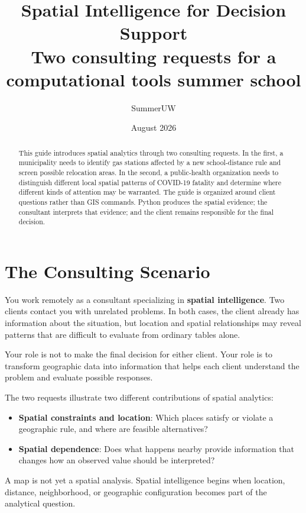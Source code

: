 \documentclass[11pt]{article}
\title{\textbf{Spatial Intelligence for Decision Support}\\[0.4em]
\large Two consulting requests for a computational tools summer school}
\author{SummerUW}
\date{August 2026}
\begin{document}
\maketitle

\begin{abstract}
This guide introduces spatial analytics through two consulting requests. In the first, a municipality needs to identify gas stations affected by a new school-distance rule and screen possible relocation areas. In the second, a public-health organization needs to distinguish different local spatial patterns of COVID-19 fatality and determine where different kinds of attention may be warranted. The guide is organized around client questions rather than GIS commands. Python produces the spatial evidence; the consultant interprets that evidence; and the client remains responsible for the final decision.
\end{abstract}

\tableofcontents
\newpage

\section{The Consulting Scenario}

You work remotely as a consultant specializing in \textbf{spatial intelligence}. Two clients contact you with unrelated problems. In both cases, the client already has information about the situation, but location and spatial relationships may reveal patterns that are difficult to evaluate from ordinary tables alone.

Your role is not to make the final decision for either client. Your role is to transform geographic data into information that helps each client understand the problem and evaluate possible responses.

The two requests illustrate two different contributions of spatial analytics:

\begin{itemize}[leftmargin=*]
    \item \textbf{Spatial constraints and location}: Which places satisfy or violate a geographic rule, and where are feasible alternatives?
    \item \textbf{Spatial dependence}: Does what happens nearby provide information that changes how an observed value should be interpreted?
\end{itemize}

\begin{validationbox}
A map is not yet a spatial analysis. Spatial intelligence begins when location, distance, neighborhood, or geographic configuration becomes part of the analytical question.
\end{validationbox}
\end{document}
